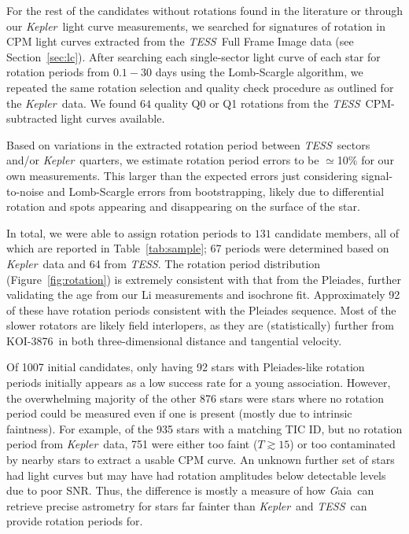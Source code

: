 \documentclass[twocolumn]{aastex631}
\newcommand{\starname}{KOI-3876}
\newcommand{\kepler}{{\it Kepler}}
\newcommand{\tess}{\textit{TESS}}
\newcommand{\gaia}{{\textit Gaia}}
\begin{document}
For the rest of the candidates without rotations found in the literature or through our \kepler\ light curve measurements, we searched for signatures of rotation in CPM light curves extracted from the \tess\ Full Frame Image data (see Section~\ref{sec:lc}). After searching each single-sector light curve of each star for rotation periods from $0.1-30$ days using the Lomb-Scargle algorithm, we repeated the same rotation selection and quality check procedure as outlined for the \kepler\ data. We found $64$ quality Q0 or Q1 rotations from the \tess\ CPM-subtracted light curves available. 

Based on variations in the extracted rotation period between \tess\ sectors and/or \kepler\ quarters, we estimate rotation period errors to be $\simeq$10\% for our own measurements. This larger than the expected errors just considering signal-to-noise and Lomb-Scargle errors from bootstrapping, likely due to differential rotation and spots appearing and disappearing on the surface of the star.

In total, we were able to assign rotation periods to $131$ candidate members, all of which are reported in Table~\ref{tab:sample}; 67 periods were determined based on \kepler\ data and 64 from \tess. The rotation period distribution (Figure~\ref{fig:rotation}) is extremely consistent with that from the Pleiades, further validating the age from our Li measurements and isochrone fit. Approximately 92 of these have rotation periods consistent with the Pleiades sequence. Most of the slower rotators are likely field interlopers, as they are (statistically) further from \starname\ in both three-dimensional distance and tangential velocity. 

Of 1007 initial candidates, only having 92 stars with Pleiades-like rotation periods initially appears as a low success rate for a young association. However, the overwhelming majority of the other 876 stars were stars where no rotation period could be measured even if one is present (mostly due to intrinsic faintness). For example, of the 935 stars with a matching TIC ID, but no rotation period from \kepler\ data, 751 were either too faint ($T\gtrsim15$) or too contaminated by nearby stars to extract a usable CPM curve. An unknown further set of stars had light curves but may have had rotation amplitudes below detectable levels due to poor SNR. Thus, the difference is mostly a measure of how \gaia\ can retrieve precise astrometry for stars far fainter than \kepler\ and \tess\ can provide rotation periods for. 
\end{document}
